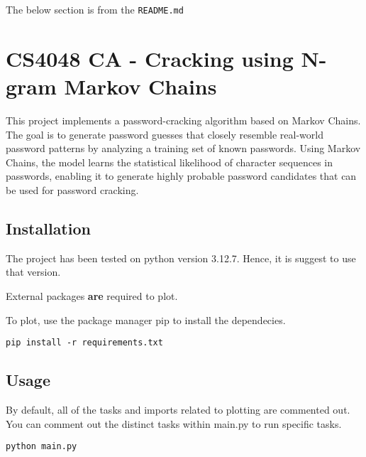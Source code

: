 The below section is from the \verb|README.md|

\section{CS4048 CA - Cracking using N-gram Markov Chains}
This project implements a password-cracking algorithm based on Markov Chains. The goal is to generate password guesses that closely resemble real-world password patterns by analyzing a training set of known passwords. Using Markov Chains, the model learns the statistical likelihood of character sequences in passwords, enabling it to generate highly probable password candidates that can be used for password cracking.

\subsection{Installation}
The project has been tested on python version 3.12.7. Hence, it is suggest to use that version.

External packages \textbf{are} required to plot.

To plot, use the package manager pip to install the dependecies.
\begin{lstlisting}
pip install -r requirements.txt
\end{lstlisting}

\subsection{Usage}

By default, all of the tasks and imports related to plotting are commented out. You can comment out the distinct tasks within main.py to run specific tasks.

\begin{lstlisting}
python main.py
\end{lstlisting}